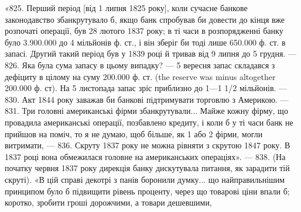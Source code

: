 «825. Перший період [від 1 липня 1825 року], коли сучасне банкове
законодавство збанкрутувало б, якщо банк спробував би довести до кінця вже
розпочаті операції, був 28 лютого 1837 року; в ті часи в розпорядженні банку
було 3.900.000 до 4 мільйонів ф. ст., і він зберіг би тоді лише 650.000 ф. ст.
в запасі. Другий такий період був у 1839 році й тривав від 9 липня до 5 грудня.
— 826. Яка була сума запасу в цьому випадку? — 5 вересня запас
складався з дефіциту в цілому на суму 200.000 ф. ст. (the reserve was minus
altogether 200.000 ф. ст). На 5 листопада запас зріс приблизно до 1—1 1/2
мільйонів. — 830. Акт 1844 року заважав би банкові підтримувати торговлю
з Америкою. — 831. Три головні американські фірми збанкрутували... Майже
кожну фірму, що провадила американські операції, позбавлено кредиту, і
коли б у ті часи банк не прийшов на поміч, то я не думаю, щоб більше, як
1 або 2 фірми, могли витримати, — 836. Скруту 1837 року не можна рівняти
з скрутою 1847 року. В 1837 році вона обмежилася головне на американських
операціях». — 838. (На початку червня 1837 року дирекція банку дискутувала
питання, як зарадити тій скруті). «В цій справі декотрі з панів боронили думку...
що найправильнішим принципом було б підвищити рівень проценту, через що
товарові ціни впали б; коротко, зробити гроші дорожчими, а товари дешевшими,
\parbreak{}  %
